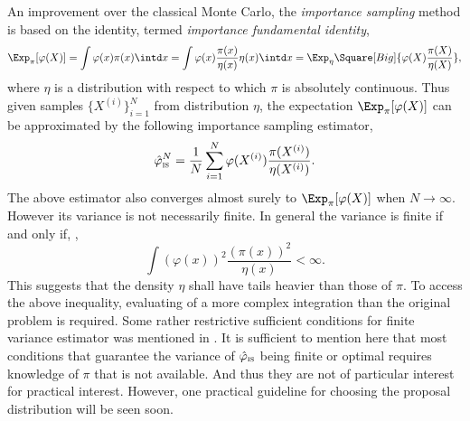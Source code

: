 An improvement over the classical Monte Carlo, the \emph{importance sampling}
method is based on the identity, termed \emph{importance fundamental
  identity},
\begin{equation}
  \Exp_{\pi}[\varphi(X)]
  = \int\varphi(x)\pi(x)\intd x
  = \int\varphi(x)\frac{\pi(x)}{\eta(x)}\eta(x)\intd x
  = \Exp_{\eta}\Square[Big]{\varphi(X)\frac{\pi(X)}{\eta(X)}},
\end{equation}
where $\eta$ is a distribution with respect to which $\pi$ is absolutely
continuous. Thus given \iid samples $\{X^{(i)}\}_{i=1}^N$ from distribution
$\eta$, the expectation $\Exp_{\pi}[\varphi(X)]$ can be approximated by the
following importance sampling estimator,
\begin{equation}
  \hat\varphi_{\text{\textsc{is}}}^N
  = \frac{1}{N}\sum_{i=1}^N\varphi(X^{(i)})\frac{\pi(X^{(i)})}{\eta(X^{(i)})}.
\end{equation}
The above estimator also converges almost surely to $\Exp_{\pi}[\varphi(X)]$
when $N\to\infty$. However its variance is not necessarily finite. In general
the variance is finite if and only if,
\cite[][sec.~3.3.2]{Robert:2004tn},
\begin{equation}
  \int(\varphi(x))^2\frac{(\pi(x))^2}{\eta(x)} < \infty.
\end{equation}
This suggests that the density $\eta$ shall have tails heavier than those of
$\pi$. To access the above inequality, evaluating of a more complex
integration than the original problem is required. Some rather restrictive
sufficient conditions for finite variance estimator was mentioned in
\cite{Geweke:1989tm}. It is sufficient to mention here that most conditions
that guarantee the variance of $\hat\varphi_{\text{\textsc{is}}}$ being finite
or optimal requires knowledge of $\pi$ that is not available. And thus they
are not of particular interest for practical interest. However, one practical
guideline for choosing the proposal distribution will be seen soon.


